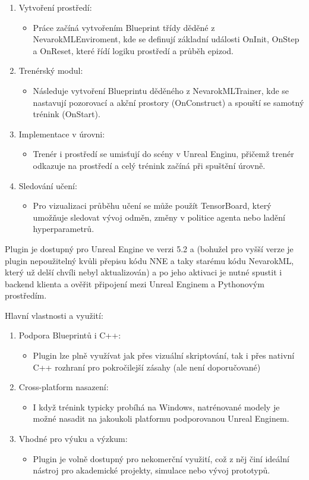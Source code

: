 \begin{enumerate}
\item Vytvoření prostředí:
\begin{itemize}
\item Práce začíná vytvořením Blueprint třídy děděné z NevarokMLEnviroment, kde se definují základní události OnInit, OnStep a OnReset, které řídí logiku prostředí a průběh epizod.
\end{itemize}
\item Trenérský modul:
\begin{itemize}
\item Následuje vytvoření Blueprintu děděného z NevarokMLTrainer, kde se nastavují pozorovací a akční prostory (OnConstruct) a spouští se samotný trénink (OnStart).
\end{itemize}
\item Implementace v úrovni:
\begin{itemize}
\item Trenér i prostředí se umisťují do scény v Unreal Enginu, přičemž trenér odkazuje na prostředí a celý trénink začíná při spuštění úrovně.
\end{itemize}

\item Sledování učení:
\begin{itemize}
\item Pro vizualizaci průběhu učení se může použít TensorBoard, který umožňuje sledovat vývoj odměn, změny v politice agenta nebo ladění hyperparametrů.
\end{itemize}
\end{enumerate}

Plugin je dostupný pro Unreal Engine ve verzi 5.2 a  (bohužel pro vyšší verze je plugin nepoužitelný kvůli přepisu kódu NNE a taky starému kódu NevarokML, který už delší chvíli nebyl aktualizován) a po jeho aktivaci je nutné spustit i backend klienta a ověřit připojení mezi Unreal Enginem a Pythonovým prostředím.

Hlavní vlastnosti a využití:
\begin{enumerate}
\item Podpora Blueprintů i C++:
\begin{itemize}
\item Plugin lze plně využívat jak přes vizuální skriptování, tak i přes nativní C++ rozhraní pro pokročilejší zásahy (ale není doporučované)
\end{itemize}
\item Cross-platform nasazení:
\begin{itemize}
\item I když trénink typicky probíhá na Windows, natrénované modely je možné nasadit na jakoukoli platformu podporovanou Unreal Enginem.
\end{itemize}
\item Vhodné pro výuku a výzkum:
\begin{itemize}
\item Plugin je volně dostupný pro nekomerční využití, což z něj činí ideální nástroj pro akademické projekty, simulace nebo vývoj prototypů.
\end{itemize}
\end{enumerate}

